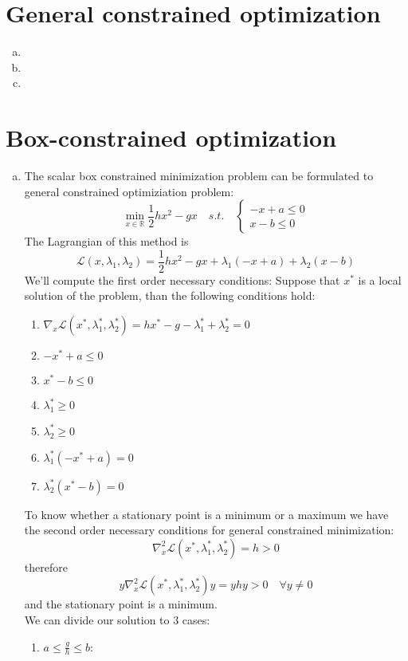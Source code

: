 \documentclass{article}
\begin{document}
\section{General constrained optimization}
\begin{enumerate}[(a)] 
\item 
\item 
\item 
\end{enumerate}
\section{Box-constrained optimization}
\begin{enumerate}[(a)]
\item The scalar box constrained minimization problem can be formulated to general constrained optimiziation problem:
\[\min_{x\in \mathbb{R}}\frac{1}{2}hx^2-gx\quad s.t. \quad  
\begin{cases}
-x+a \le 0\\
x-b \le 0
\end{cases}
\]
The Lagrangian of this method is
\[\mathcal{L}(x, \lambda_1, \lambda_2) =  \frac{1}{2}hx^2-gx + \lambda_1(-x+a) + \lambda_2(x-b)\]
We'll compute the first order necessary conditions: Suppose that $x^*$ is a local solution of the problem, than the following conditions hold:
\begin{enumerate}[(1)] 
\item $\nabla_x\mathcal{L}(x^*, \lambda_1^*, \lambda_2^*) = hx^*-g -\lambda_1^*+\lambda_2^* = 0$
\item $-x^*+a \le 0$
\item $x^*-b \le 0$
\item $\lambda_1^* \ge 0$
\item $\lambda_2^* \ge 0$
\item $\lambda_1^*(-x^*+a) = 0$
\item $\lambda_2^*(x^*-b) = 0$
\end{enumerate}
To know whether a stationary point is a minimum or a maximum we have the second order necessary conditions for general constrained minimization:
\[\nabla_x^2\mathcal{L}(x^*, \lambda_1^*, \lambda_2^*) = h > 0\]
therefore
\[y\nabla_x^2\mathcal{L}(x^*, \lambda_1^*, \lambda_2^*)y  = yhy> 0 \quad \forall y \ne 0\]
and the stationary point is a minimum.\\
We can divide our solution to 3 cases:
\begin{enumerate}
\item $a \le \frac{g}{h} \le b$:\\

\end{enumerate}
\end{enumerate}
\end{document}

